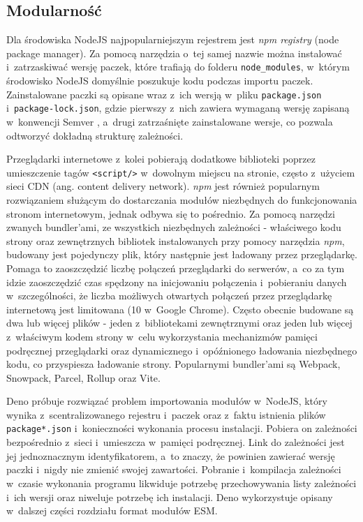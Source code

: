 \subsection{Modularność}

Dla środowiska NodeJS najpopularniejszym rejestrem jest \textit{npm registry} (node package manager). Za pomocą narzędzia o~tej samej nazwie można instalować i~zatrzaskiwać wersję paczek, które trafiają do folderu \lstinline{node_modules}, w~którym środowisko NodeJS domyślnie poszukuje kodu podczas importu paczek. Zainstalowane paczki są opisane wraz z~ich wersją w~pliku \mbox{\lstinline{package.json}} i~\lstinline{package-lock.json}, gdzie pierwszy z~nich zawiera wymaganą wersję zapisaną w~konwencji Semver \cite{semver}, a~drugi zatrzaśnięte zainstalowane wersje, co pozwala odtworzyć dokładną strukturę zależności.

Przeglądarki internetowe z~kolei pobierają dodatkowe biblioteki poprzez umieszczenie tagów \lstinline{<script/>} w~dowolnym miejscu na stronie, często z~użyciem sieci CDN (ang. content delivery network). \textit{npm} jest również popularnym rozwiązaniem służącym do dostarczania modułów niezbędnych do funkcjonowania stronom internetowym, jednak odbywa się to pośrednio. Za pomocą narzędzi zwanych bundler'ami, ze wszystkich niezbędnych zależności - właściwego kodu strony oraz zewnętrznych bibliotek instalowanych przy pomocy narzędzia \textit{npm}, budowany jest pojedynczy plik, który następnie jest ładowany przez przeglądarkę. Pomaga to zaoszczędzić liczbę połączeń przeglądarki do serwerów, a~co za tym idzie zaoszczędzić czas spędzony na inicjowaniu połączenia i~pobieraniu danych w~szczególności, że liczba możliwych otwartych połączeń przez przeglądarkę internetową jest limitowana (10 w~Google Chrome). Często obecnie budowane są dwa lub więcej plików - jeden z~bibliotekami zewnętrznymi oraz jeden lub więcej z~właściwym kodem strony w~celu wykorzystania mechanizmów pamięci podręcznej przeglądarki oraz dynamicznego i~opóźnionego ładowania niezbędnego kodu, co przyspiesza ładowanie strony. Popularnymi bundler'ami są Webpack, Snowpack, Parcel, Rollup oraz Vite.

Deno próbuje rozwiązać problem importowania modułów w~NodeJS, który wynika z~scentralizowanego rejestru i~paczek oraz z~faktu istnienia plików \lstinline{package*.json} i~konieczności wykonania procesu instalacji. Pobiera on zależności bezpośrednio z~sieci i~umieszcza w~pamięci podręcznej. Link do zależności jest jej jednoznacznym identyfikatorem, a~to znaczy, że powinien zawierać wersję paczki i~nigdy nie zmienić swojej zawartości. Pobranie i~kompilacja zależności w~czasie wykonania programu likwiduje potrzebę przechowywania listy zależności i~ich wersji oraz niweluje potrzebę ich instalacji. Deno wykorzystuje opisany w~dalszej części rozdziału format modułów ESM.

